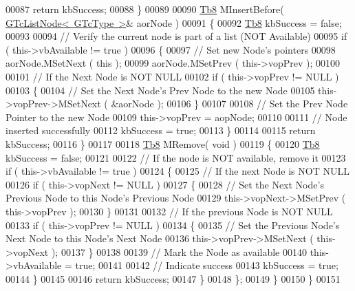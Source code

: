 \begin{DoxyCode}
00087             \textcolor{keywordflow}{return} kbSuccess;
00088          \}
00089 
00090          \mbox{\hyperlink{namespace_g_n_common_a8115dc7ed53b6e5b52e6bfde1632ea74}{Tb8}} MInsertBefore( \mbox{\hyperlink{class_g_n_common_1_1_n_containers_1_1_g_tc_list_node}{GTcListNode< GTcType >}}& aorNode )
00091          \{
00092             \mbox{\hyperlink{namespace_g_n_common_a8115dc7ed53b6e5b52e6bfde1632ea74}{Tb8}} kbSuccess = \textcolor{keyword}{false};
00093 
00094             \textcolor{comment}{// Verify the current node is part of a list (NOT Available)}
00095             \textcolor{keywordflow}{if} ( this->vbAvailable != \textcolor{keyword}{true} )
00096             \{
00097                \textcolor{comment}{// Set new Node's pointers}
00098                aorNode.MSetNext ( \textcolor{keyword}{this} );
00099                aorNode.MSetPrev ( this->vopPrev );
00100 
00101                \textcolor{comment}{// If the Next Node is NOT NULL}
00102                \textcolor{keywordflow}{if} ( this->vopPrev != NULL )
00103                \{
00104                   \textcolor{comment}{// Set the Next Node's Prev Node to the new Node}
00105                   this->vopPrev->MSetNext ( &aorNode );
00106                \}
00107 
00108                \textcolor{comment}{// Set the Prev Node Pointer to the new Node}
00109                this->vopPrev = aopNode;
00110 
00111                \textcolor{comment}{// Node inserted successfully}
00112                kbSuccess = \textcolor{keyword}{true};
00113             \}
00114 
00115             \textcolor{keywordflow}{return} kbSuccess;
00116          \}
00117 
00118          \mbox{\hyperlink{namespace_g_n_common_a8115dc7ed53b6e5b52e6bfde1632ea74}{Tb8}} MRemove( \textcolor{keywordtype}{void} )
00119          \{
00120             \mbox{\hyperlink{namespace_g_n_common_a8115dc7ed53b6e5b52e6bfde1632ea74}{Tb8}} kbSuccess = \textcolor{keyword}{false};
00121 
00122             \textcolor{comment}{// If the node is NOT available, remove it}
00123             \textcolor{keywordflow}{if} ( this->vbAvailable != \textcolor{keyword}{true} )
00124             \{
00125                \textcolor{comment}{// If the next Node is NOT NULL}
00126                \textcolor{keywordflow}{if} ( this->vopNext != NULL )
00127                \{
00128                   \textcolor{comment}{// Set the Next Node's Previous Node to this Node's Previous Node}
00129                   this->vopNext->MSetPrev ( this->vopPrev );
00130                \}
00131 
00132                \textcolor{comment}{// If the previous Node is NOT NULL}
00133                \textcolor{keywordflow}{if} ( this->vopPrev != NULL )
00134                \{
00135                   \textcolor{comment}{// Set the Previous Node's Next Node to this Node's Next Node}
00136                   this->vopPrev->MSetNext ( this->vopNext );
00137                \}
00138 
00139                \textcolor{comment}{// Mark the Node as available}
00140                this->vbAvailable = \textcolor{keyword}{true}; 
00141 
00142                \textcolor{comment}{// Indicate success}
00143                kbSuccess = \textcolor{keyword}{true};
00144             \}
00145 
00146             \textcolor{keywordflow}{return} kbSuccess;
00147          \}
00148       \};
00149    \}
00150 \}
00151 
\end{DoxyCode}
